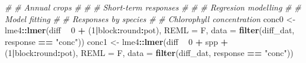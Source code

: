 \documentclass[]{scrartcl}
\newenvironment{Shaded}{\begin{snugshade}}{\end{snugshade}}
\newcommand{\CommentTok}[1]{\textcolor[rgb]{0.56,0.35,0.01}{\textit{#1}}}
\newcommand{\DataTypeTok}[1]{\textcolor[rgb]{0.13,0.29,0.53}{#1}}
\newcommand{\DecValTok}[1]{\textcolor[rgb]{0.00,0.00,0.81}{#1}}
\newcommand{\KeywordTok}[1]{\textcolor[rgb]{0.13,0.29,0.53}{\textbf{#1}}}
\newcommand{\NormalTok}[1]{#1}
\newcommand{\OperatorTok}[1]{\textcolor[rgb]{0.81,0.36,0.00}{\textbf{#1}}}
\newcommand{\StringTok}[1]{\textcolor[rgb]{0.31,0.60,0.02}{#1}}
\begin{document}
\begin{Shaded}
\begin{Highlighting}[]
\CommentTok{#}
\CommentTok{# Annual crops }
\CommentTok{#}
\CommentTok{#}
\CommentTok{# Short-term responses}
\CommentTok{#}
\CommentTok{#}
\CommentTok{# Regresion modelling }
\CommentTok{#}
\CommentTok{# Model fitting }
\CommentTok{#}
\CommentTok{# Responses by species }
\CommentTok{#}
  \CommentTok{# Chlorophyll concentration  }
\NormalTok{    conc0 <-}\StringTok{ }\NormalTok{lme4}\OperatorTok{::}\KeywordTok{lmer}\NormalTok{(diff }\OperatorTok{~}\StringTok{ }\DecValTok{0} \OperatorTok{+}\StringTok{ }\NormalTok{(}\DecValTok{1}\OperatorTok{|}\NormalTok{block}\OperatorTok{:}\NormalTok{round}\OperatorTok{:}\NormalTok{pot), }\DataTypeTok{REML =}\NormalTok{ F,}
                        \DataTypeTok{data =} \KeywordTok{filter}\NormalTok{(diff_dat, response }\OperatorTok{==}\StringTok{ "conc"}\NormalTok{)) }
\NormalTok{    conc1 <-}\StringTok{ }\NormalTok{lme4}\OperatorTok{::}\KeywordTok{lmer}\NormalTok{(diff }\OperatorTok{~}\StringTok{ }\DecValTok{0} \OperatorTok{+}\StringTok{ }\NormalTok{spp }\OperatorTok{+}\StringTok{ }\NormalTok{(}\DecValTok{1}\OperatorTok{|}\NormalTok{block}\OperatorTok{:}\NormalTok{round}\OperatorTok{:}\NormalTok{pot), }\DataTypeTok{REML =}\NormalTok{ F,}
                        \DataTypeTok{data =} \KeywordTok{filter}\NormalTok{(diff_dat, response }\OperatorTok{==}\StringTok{ "conc"}\NormalTok{)) }


\end{Highlighting}
\end{Shaded}
\end{document}
